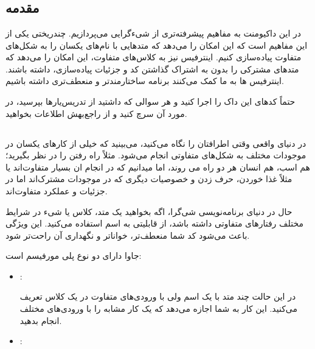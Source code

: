 \chapter{\DocTitle}
\section{مقدمه}

در این داکیومنت به مفاهیم پیشرفته‌تری از شیءگرایی می‌پردازیم. چندریختی
 یکی از این مفاهیم است که این امکان را می‌دهد که
متدهایی با نام‌های یکسان را به شکل‌های متفاوت پیاده‌سازی کنیم. اینترفیس نیز
به کلاس‌های متفاوت، این امکان را می‌دهد که متدهای مشترکی را بدون به اشتراک
گذاشتن کد و جزئیات پیاده‌سازی، داشته باشند. اینترفیس ها به ما کمک می‌کنند
برنامه ساختارمندتر و منعطف‌تری داشته باشیم.

حتماً کدهای این داک را اجرا کنید و هر سوالی که داشتید از تدریس‌یارها
بپرسید، در مورد آن سرچ کنید و از  راجع‌بهش اطلاعات بخواهید.

\section{}

در دنیای واقعی وقتی اطرافتان را نگاه می‌کنید، می‌بینید که خیلی از کارهای
یکسان در موجودات مختلف به شکل‌های متفاوتی انجام می‌شود. مثلاً راه رفتن را
در نظر بگیرید؛ هم اسب، هم انسان هر دو راه می روند، اما میدانیم که در
انجام ان بسیار متفاوت‌اند یا مثلاً غذا خوردن، حرف زدن و خصوصیات دیگری که
در موجودات مشترک‌اند اما در جزئیات و عملکرد متفاوت‌اند.

حال در دنیای برنامه‌نویسی شی‌گرا، اگه بخواهید یک متد، کلاس یا شیء در شرایط
مختلف رفتارهای متفاوتی داشته باشد، از قابلیتی به اسم 
استفاده می‌کنید. این ویژگی باعث می‌شود کد شما منعطف‌تر، خواناتر و نگهداری
آن راحت‌تر شود.

جاوا دارای دو نوع پلی مورفیسم است:

\begin{itemize}
\item
  \textbf{}:

  در این حالت چند متد با یک اسم ولی با ورودی‌های متفاوت در یک کلاس تعریف
  می‌کنید. این کار به شما اجازه می‌دهد که یک کار مشابه را با ورودی‌های
  مختلف انجام بدهید.
\item
  \textbf{}:
\end{itemize}

